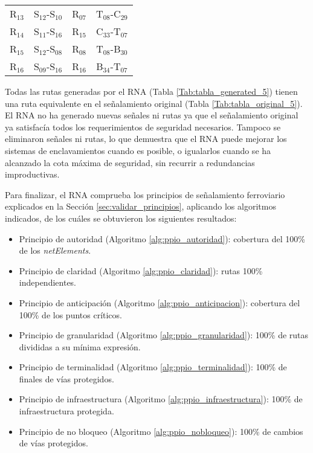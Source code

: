 \begin{table}[!h]
{{\begin{tabular}{ c c c c }
                    R$_{13}$ & S$_{12}$-S$_{10}$ & R$_{07}$ & T$_{08}$-C$_{29}$ \\
                    R$_{14}$ & S$_{11}$-S$_{16}$ & R$_{15}$ & C$_{33}$-T$_{07}$ \\
                    R$_{15}$ & S$_{12}$-S$_{08}$ & R$_{08}$ & T$_{08}$-B$_{30}$ \\
                    R$_{16}$ & S$_{09}$-S$_{16}$ & R$_{16}$ & B$_{34}$-T$_{07}$ \\
                \hline
            \end{tabular}
     		}
        }    
    \end{table}
    
    Todas las rutas generadas por el RNA (Tabla \ref{Tab:tabla_generated_5}) tienen una ruta equivalente en el señalamiento original (Tabla \ref{Tab:tabla_original_5}). El RNA no ha generado nuevas señales ni rutas ya que el señalamiento original ya satisfacía todos los requerimientos de seguridad necesarios. Tampoco se eliminaron señales ni rutas, lo que demuestra que el RNA puede mejorar los sistemas de enclavamientos cuando es posible, o igualarlos cuando se ha alcanzado la cota máxima de seguridad, sin recurrir a redundancias improductivas.
    
    Para finalizar, el RNA comprueba los principios de señalamiento ferroviario explicados en la Sección \ref{sec:validar_principios}, aplicando los algoritmos indicados, de los cuáles se obtuvieron los siguientes resultados:
    
    \begin{itemize}
    	\item Principio de autoridad (Algoritmo \ref{alg:ppio_autoridad}): cobertura del 100\% de los \textit{netElements}.
    	\item Principio de claridad (Algoritmo \ref{alg:ppio_claridad}): rutas 100\% independientes.
    	\item Principio de anticipación (Algoritmo \ref{alg:ppio_anticipacion}): cobertura del 100\% de los puntos críticos.
    	\item Principio de granularidad (Algoritmo \ref{alg:ppio_granularidad}): 100\% de rutas divididas a su mínima expresión.
    	\item Principio de terminalidad (Algoritmo \ref{alg:ppio_terminalidad}): 100\% de finales de vías protegidos.
    	\item Principio de infraestructura (Algoritmo \ref{alg:ppio_infraestructura}): 100\% de infraestructura protegida.
    	\item Principio de no bloqueo (Algoritmo \ref{alg:ppio_nobloqueo}): 100\% de cambios de vías protegidos.
    \end{itemize}	